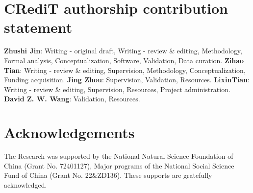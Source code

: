 \documentclass[preprint,12pt,authoryear]{elsarticle}
\begin{document}
\section*{CRediT authorship contribution statement}
\textbf{Zhushi Jin}: Writing - original draft, Writing - review \& editing,  Methodology, Formal analysis, Conceptualization, Software, Validation,  Data curation. \textbf{Zihao Tian}: Writing - review \& editing, Supervision, Methodology, Conceptualization, Funding acquisition. \textbf{Jing Zhou}: Supervision, Validation, Resources. \textbf{LixinTian}: Writing - review \& editing, Supervision, Resources, Project administration. \textbf{David Z. W. Wang}: Validation, Resources.


\section*{Acknowledgements}
The Research was supported by the National Natural Science Foundation of China (Grant No. 72401127), Major programs of the National Social Science Fund of China (Grant No. 22\&ZD136). These supports are gratefully acknowledged.





\end{document}
